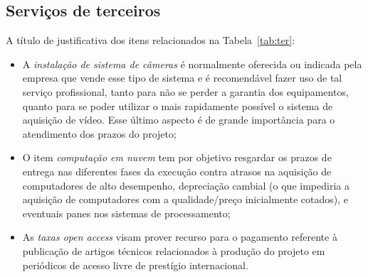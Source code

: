 \subsection{Serviços de terceiros}
A título de justificativa dos itens relacionados na Tabela~\ref{tab:ter}: 
\begin{itemize}
	\item A \emph{instalação de sistema de câmeras} é normalmente oferecida ou indicada pela empresa que vende esse tipo de sistema e é recomendável fazer uso de tal serviço profissional, tanto para não se perder a garantia dos equipamentos, quanto para se poder utilizar o mais rapidamente possível o sistema de aquisição de vídeo. Esse último aspecto é de grande importância para o atendimento dos prazos do projeto;
	\item O item \emph{computação em nuvem} tem por objetivo resgardar os prazos de entrega nas diferentes fases da execução contra atrasos na aquisição de computadores de alto desempenho, depreciação cambial (o que impediria a aquisição de computadores com a qualidade/preço inicialmente cotados), e eventuais panes nos sistemas de processamento;
	\item As \emph{taxas open access} visam prover recurso para o pagamento referente à publicação de artigos técnicos relacionados à produção do projeto  em periódicos de acesso livre de prestígio internacional.
\end{itemize}
